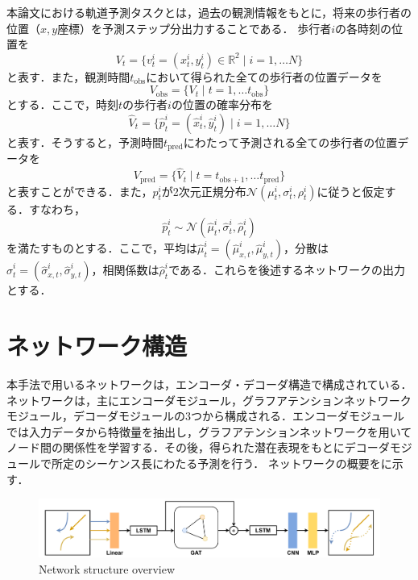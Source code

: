 本論文における軌道予測タスクとは，過去の観測情報をもとに，将来の歩行者の位置（$x,y$座標）を予測ステップ分出力することである．
歩行者$i$の各時刻の位置を
\begin{equation}
  V_t = \{ v^i_t = (x^i_t, y^i_t) \in \mathbb{R}^2 \mid i = 1, \dots N \}
\end{equation}
と表す．また，観測時間$t_{\text{obs}}$において得られた全ての歩行者の位置データを
\begin{equation}
  V_{\text{obs}} = \{ V_t \mid t = 1, \dots t_{\text{obs}} \}  
\end{equation}
とする．ここで，時刻$t$の歩行者$i$の位置の確率分布を
\begin{equation}
  \hat{V}_t = \{ \hat{p}^i_t = (\hat{x}^i_t, \hat{y}^i_t) \mid i = 1, \dots N \} \label{hat-pos}
\end{equation}
と表す．そうすると，予測時間$t_{\text{pred}}$にわたって予測される全ての歩行者の位置データを
\begin{equation}
  V_{\text{pred}} = \{ \hat{V}_t \mid t = t_{\text{obs} + 1}, \dots t_{\text{pred}} \}
\end{equation}
と表すことができる．また，$p^i_t$が2次元正規分布$\mathcal{N}(\mu^i_t, \sigma^i_t, \rho^i_t)$に従うと仮定する．すなわち，
\begin{equation}
  \hat{p}^i_t \sim \mathcal{N}(\hat{\mu}^i_t, \hat{\sigma}^i_t, \hat{\rho}^i_t)
\end{equation}
を満たすものとする．ここで，平均は$\hat{\mu}^i_t = (\hat{\mu}^i_{x, t}, \hat{\mu}^i_{y, t})$，分散は$\hat{\sigma}^i_t = (\hat{\sigma}^i_{x, t}, \hat{\sigma}^i_{y, t})$，相関係数は$\hat{\rho}^i_t$である．これらを後述するネットワークの出力とする．

\section{ネットワーク構造}
本手法で用いるネットワークは，エンコーダ・デコーダ構造で構成されている．ネットワークは，主にエンコーダモジュール，グラフアテンションネットワークモジュール，デコーダモジュールの3つから構成される．エンコーダモジュールでは入力データから特徴量を抽出し，グラフアテンションネットワークを用いてノード間の関係性を学習する．その後，得られた潜在表現をもとにデコーダモジュールで所定のシーケンス長にわたる予測を行う．
ネットワークの概要をに示す．

\begin{figure}[H]
  \centering
 \includegraphics[keepaspectratio, scale=0.36]
      {images/network-comp.pdf}
\caption{Network structure overview}
 \label{Fig:network}
\end{figure}   

